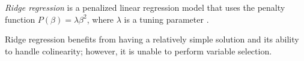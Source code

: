 \documentclass{article}
\newcommand{\argmin}[2]{\underset{#1}{\text{arg min}}\left\{#2\right\}}
\begin{document}

	
	\textit{Ridge regression} is a penalized linear regression model that uses the penalty function $P(\beta) = \lambda\beta^2$, where $\lambda$ is a tuning parameter \cite{hoerl1970ridge}.

	Ridge regression benefits from having a relatively simple solution and its ability to handle colinearity; however, it is unable to perform variable selection.
	
\end{document}
